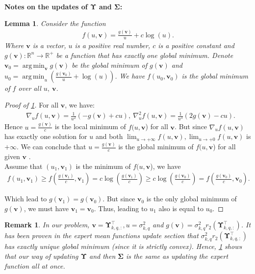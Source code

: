 \documentclass{article}
\newcommand{\nn}{\nonumber} %
\newtheorem{remark}{Remark}
\newtheorem{lemma}{Lemma}
\def\vv{{\bm{v}}}
\def\evu{{u}}
\def\mSigma{{\bm{\Sigma}}}
\def\mUpsilon{{\bm{\Upsilon}}}
\newcommand{\R}{\mathbb{R}}
\DeclareMathOperator*{\argmin}{arg\,min}
\begin{document}
{\bf Notes on the updates of $\mUpsilon$ and $\mSigma$:}
\begin{lemma} \label{lemm_notes_Upsilon_Sigma}
    Consider the function 
    \begin{align}
        f(\evu,\vv)=\frac{g(\vv)}{\evu}+c\log(\evu). \nn
    \end{align}
    Where $\vv$ is a vector, $\evu$ is a positive real number, $c$ is a positive constant and $g(\vv): \R^{n}\rightarrow \R^{+}$ be a function that has exactly one global minimum. 
    Denote $\vv_0=\displaystyle\argmin_{\vv}g(\vv)$ be the global minimum of $g(\vv)$ and $\evu_0=\displaystyle\argmin_{\evu}\left(\frac{g(\vv_0)}{\evu}+\log(\evu)\right)$. We have $f(\evu_0,\vv_0)$ is the global minimum of $f$ over all $\evu,~\vv$.
\end{lemma}
\begin{proof}[Proof of \cref{lemm_notes_Upsilon_Sigma}]
    For all $\vv$, we have:
    \begin{align*}
        &\nabla_u f(\evu,\vv)=\frac{1}{\evu^2}(-g(\vv)+cu),~\nabla^2_u f(\evu,\vv)=\frac{1}{\evu^3}(2g(\vv)-cu).
    \end{align*}
    Hence $\evu=\frac{g(\vv)}{c}$ is the local minimum of $f(\evu,\vv$) for all $\vv$. But since $\nabla_{\evu}f(\evu,\vv)$ has exactly one solution for $\evu$ and both $\displaystyle\lim_{\evu\rightarrow+\infty}f(\evu,\vv), \displaystyle\lim_{\evu\rightarrow+0}f(\evu,\vv)$ is $+\infty$. We can conclude that $\evu=\frac{g(\vv)}{c}$ is the global minimum of $f(\evu,\vv$) for all given $\vv$ .\\
    Assume that $(\evu_1,\vv_1)$ is the minimum of $f(\evu,\vv$), we have
    \begin{align*}
        f(\evu_1,\vv_1)\geq f\left(\frac{g(\vv_1)}{c},\vv_1\right)=c\log\left(\frac{g(\vv_1)}{c}\right) \geq c\log\left(\frac{g(\vv_0)}{c}\right)= f\left(\frac{g(\vv_0)}{c},\vv_0\right).
    \end{align*}
    \par Which lead to $g(\vv_1)=g(\vv_0)$. But since  $\vv_0$ is the only global minimum of $g(\vv)$, we must have $\vv_1=\vv_0$. Thus, leading to $\evu_1$ also is equal to $\evu_0$.
\end{proof}

\begin{remark}
    In our problem, $\vv=\mUpsilon_{k,q,:}^{\top}, \evu=\sigma_{k,q}^2$ and $g(\vv)=\sigma_{k,q}^2r_2(\mUpsilon_{k,q,:}^{\top})$. It has been proven in the expert mean functions update section that $\sigma_{k,q}^2r_2(\mUpsilon_{k,q,:}^{\top})$ has exactly unique global minimum (since it is strictly convex). Hence, \cref{lemm_notes_Upsilon_Sigma} shows that our way of updating $\mUpsilon$ and then $\mSigma$ is the same as updating the expert function all at once.
\end{remark} 
\end{document}
